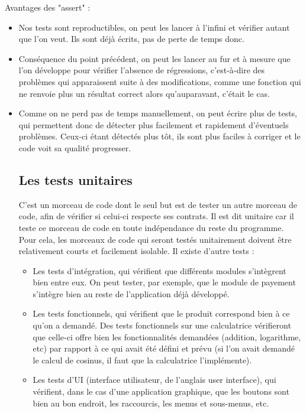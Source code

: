 \documentclass{article}
\begin{document}
Avantages des "assert" :
\begin{itemize}
    \item Nos tests sont reproductibles, on peut les lancer à l’infini et vérifier autant que l’on veut. Ils sont déjà écrits, pas de perte de temps donc.
    \item Conséquence du point précédent, on peut les lancer au fur et à mesure que l’on développe pour vérifier l’absence de régressions, c’est-à-dire des problèmes qui apparaissent suite à des modifications, comme une fonction qui ne renvoie plus un résultat correct alors qu’auparavant, c’était le cas.
    \item Comme on ne perd pas de temps manuellement, on peut écrire plus de tests, qui permettent donc de détecter plus facilement et rapidement d’éventuels problèmes. Ceux-ci étant détectés plus tôt, ils sont plus faciles à corriger et le code voit sa qualité progresser.

\subsection{Les tests unitaires}
C'est un morceau de code dont le seul but est de tester un autre morceau de code, afin de vérifier si celui-ci respecte ses contrats. Il est dit unitaire car il teste ce morceau de code en toute indépendance du reste du programme. Pour cela, les morceaux de code qui seront testés unitairement doivent être relativement courts et facilement isolable. 
Il existe d'autre tests :
\begin{itemize}
    \item Les tests d’intégration, qui vérifient que différents modules s’intègrent bien entre eux. On peut tester, par exemple, que le module de payement s’intègre bien au reste de l’application déjà développé.
    \item Les tests fonctionnels, qui vérifient que le produit correspond bien à ce qu’on a demandé. Des tests fonctionnels sur une calculatrice vérifieront que celle-ci offre bien les fonctionnalités demandées (addition, logarithme, etc) par rapport à ce qui avait été défini et prévu (si l’on avait demandé le calcul de cosinus, il faut que la calculatrice l’implémente).
    \item Les tests d’UI (interface utilisateur, de l’anglais user interface), qui vérifient, dans le cas d’une application graphique, que les boutons sont bien au bon endroit, les raccourcis, les menus et sous-menus, etc.
\end{itemize}{}


\end{itemize}
\end{document}
